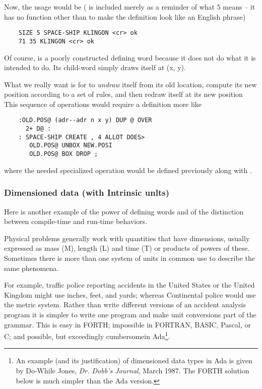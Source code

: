 Now, the usage would be ( is included merely as a reminder of what 5 means -- it has no function other than to make the definition look like an English phrase)

\begin{lstlisting}
    SIZE 5 SPACE-SHIP KLINGON <cr> ok
    71 35 KLINGON <cr> ok
\end{lstlisting}

Of course,  is a poorly constructed defining word because it does not do what it is intended to do. Its child-word  simply draws itself at (x, y).

What we really want is for  to \textit{undraw} itself from its old location, compute its new position according to a set of rules, and then redraw itself at its new position This sequence of operations would require a definition more like

\begin{lstlisting}
    :OLD.POS@ (adr--adr n x y) DUP @ OVER
      2+ D@ :
    : SPACE-SHIP CREATE , 4 ALLOT DOES>
       OLD.POS@ UNBOX NEW.POSI
       OLD.POS@ BOX DROP ;
\end{lstlisting}

where the needed specialized operation  would be defined previously along with .

\subsubsection{Dimensioned data (with Intrinsic unlts)}
Here is another example of the power of defining words and of the distinction between compile-time and run-time behaviors.

Physical problems generally work with quantities that have dimensions, usually expressed as mass (M), length (L) and time (T) or products of powers of these. Sometimes there is more than one system of units in common use to describe the same phenomena.

For example, traffic police reporting accidents in the United States or the United Kingdom might use inches, feet, and yards; whereas Continental police would use the metric system. Rather than write different versions of an accident analysis program it is simpler to write one program and make unit conversions part of the grammar. This is easy in FORTH; impossible in FORTRAN, BASIC, Pascal, or C; and possible, but exceedingly cumbersomein Ada\footnote{An example (and its justification) of dimensioned data types in Ada is given by Do-While Jones, \textit{Dr. Dobb's Journal}, March 1987. The FORTH solution below is much simpler than the Ada version.}.

